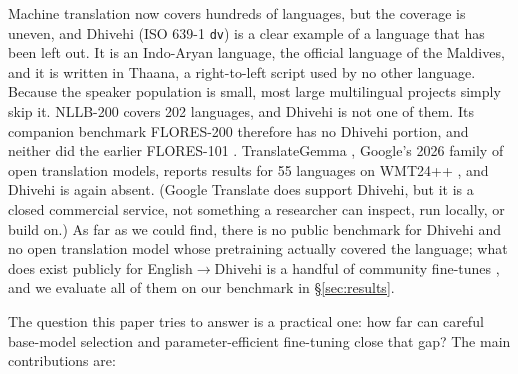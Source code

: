 \documentclass[10pt,twocolumn]{article}
\begin{document}
Machine translation now covers hundreds of languages, but the coverage is
uneven, and Dhivehi (ISO 639-1 \texttt{dv}) is a clear example of a
language that has been left out. It is an Indo-Aryan language, the official
language of the Maldives, and it is written in Thaana, a right-to-left
script used by no other language. Because the speaker population is small,
most large multilingual projects simply skip it. NLLB-200 \citep{nllb}
covers 202 languages, and Dhivehi is not one of them. Its companion
benchmark FLORES-200 therefore has no Dhivehi portion, and neither did the
earlier FLORES-101 \citep{flores101}. TranslateGemma
\citep{translategemma}, Google's 2026 family of open translation models,
reports results for 55 languages on WMT24++ \citep{wmt24pp}, and Dhivehi
is again absent. (Google Translate does support Dhivehi, but it is a
closed commercial service, not something a researcher can inspect, run
locally, or build on.) As far as we could find, there is no public
benchmark for Dhivehi and no open translation model whose pretraining
actually covered the language; what does exist publicly for
English$\to$Dhivehi is a handful of community fine-tunes
\citep{flant5endv,neobeendv}, and we evaluate all of them on our
benchmark in \S\ref{sec:results}.

The question this paper tries to answer is a practical one: how far can
careful base-model selection and parameter-efficient fine-tuning close
that gap? The main contributions are:
\end{document}
